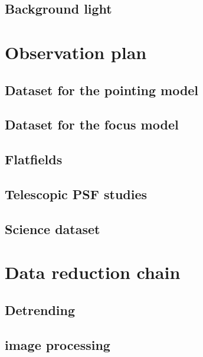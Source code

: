 \documentclass[\docopts]{\docclass}
\begin{document}

\subsection{Background light}
\label{sec:background}


\section{Observation plan}
\label{sec:plan}

\subsection{Dataset for the pointing model}
\label{sec:pointingmodel}

\subsection{Dataset for the focus model}
\label{sec:focusmodel}

\subsection{Flatfields}
\label{sec:flatfields}

\subsection{Telescopic PSF studies}


\subsection{Science dataset}
\label{sec:data}

\section{Data reduction chain}
\label{sec:dataanalysis}

\subsection{Detrending}
\label{sec:detrending}

\subsection{image processing}
\label{sec:processing}
\end{document}
